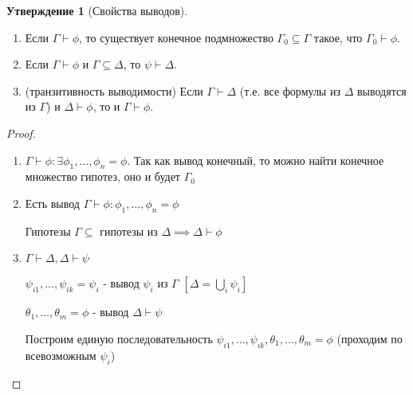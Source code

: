 \documentclass[a4paper]{article}
\theoremstyle{definition}
\newtheorem*{statement}{Утверждение}
\theoremstyle{remark}
\begin{document}
    \begin{statement}[Свойства выводов]
        $ $\\
        \begin{enumerate}
            \item Если $\Gamma \vdash \phi$, то существует конечное подмножество $\Gamma_0 \subseteq \Gamma$ такое, что $\Gamma_0 \vdash \phi$.
            \item Если $\Gamma \vdash \phi$ и $\Gamma \subseteq \Delta$, то $\psi \vdash \Delta$.
            \item (транзитивность выводимости) Если $\Gamma \vdash \Delta$ (т.е. все формулы из $\Delta$ выводятся из $\Gamma$) и 
            $\Delta \vdash \phi$, то и $\Gamma \vdash \phi$.
        \end{enumerate}
    \end{statement}
    \begin{proof}
        $ $\\
        \begin{enumerate}
            \item $\Gamma\vdash \phi: \exists\phi_1, \dots, \phi_n = \phi$.
            Так как вывод конечный, то можно найти конечное множество гипотез, оно и будет $\Gamma_0$
            \item Есть вывод $\Gamma\vdash \phi: \phi_1, \dots, \phi_n = \phi$
            
            Гипотезы $\Gamma\subseteq$ гипотезы из $\Delta\implies\Delta \vdash \phi$
            \item $\Gamma \vdash \Delta, \Delta\vdash\psi$
            
            $\psi_{i1},\dots, \psi_{ik} = \psi_i$ - вывод $\psi_i$ из $\Gamma$ $[\Delta = \bigcup_{i}\psi_i]$

            $\theta_1, \dots, \theta_m = \phi$ - вывод $\Delta\vdash\psi$

            Построим единую последовательность $\psi_{i1},\dots, \psi_{ik}, \theta_1, \dots, \theta_m = \phi$ (проходим по всевозможным
            $\psi_i$)
        \end{enumerate}
    \end{proof}
\end{document}
